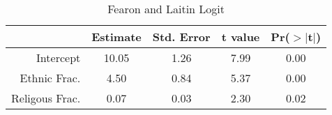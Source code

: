 \begin{table}[htb]
\centering
\caption{Fearon and Laitin Logit} 
\label{tab:FL1}
\begin{tabular}{rcccc}
  \hline
 & Estimate & Std. Error & t value & Pr($>$$|$t$|$) \\ 
  \hline
Intercept & 10.05 & 1.26 & 7.99 & 0.00 \\ 
  Ethnic Frac. & 4.50 & 0.84 & 5.37 & 0.00 \\ 
  Religous Frac. & 0.07 & 0.03 & 2.30 & 0.02 \\ 
   \hline
\end{tabular}
\end{table}
